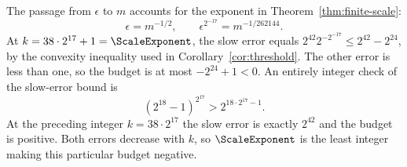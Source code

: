 The passage from $\epsilon$ to $m$ accounts for the exponent in
Theorem~\ref{thm:finite-scale}:
\[
 \epsilon=m^{-1/2},\qquad
 \epsilon^{2^{-17}}=m^{-1/262144}.
\]
At $k=38\cdot2^{17}+1=\ScaleExponent$, the slow error equals
$2^{42}2^{-2^{-17}}\le2^{42}-2^{24}$, by the convexity inequality
used in Corollary~\ref{cor:threshold}. The other error is less than one,
so the budget is at most $-2^{24}+1<0$. An entirely integer check of
the slow-error bound is
\[
 (2^{18}-1)^{2^{17}}>2^{18\cdot2^{17}-1}.
\]
At the preceding integer $k=38\cdot2^{17}$ the slow error is exactly
$2^{42}$ and the budget is positive. Both errors decrease with $k$,
so $\ScaleExponent$ is the least integer making this particular budget
negative.
